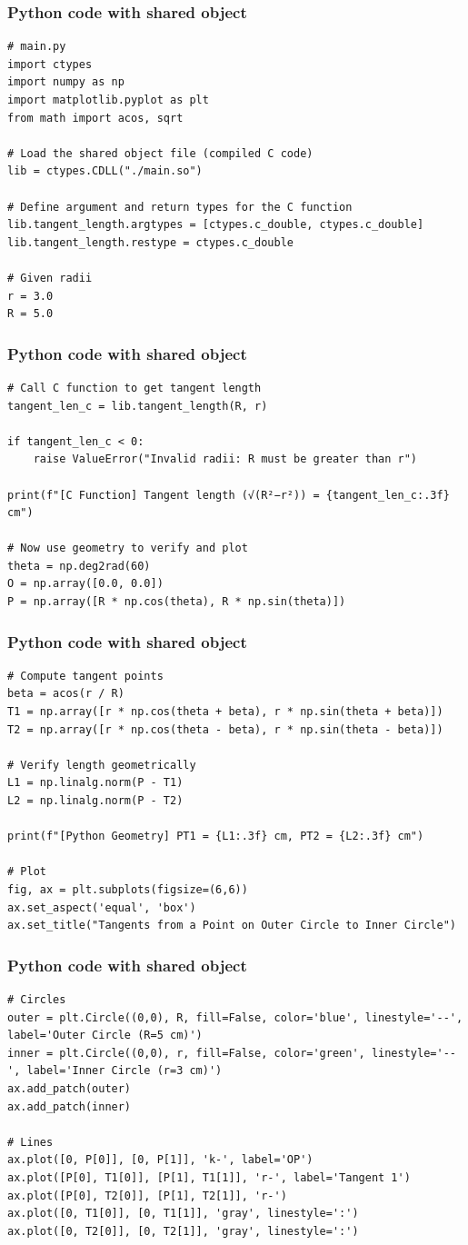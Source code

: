 \documentclass{beamer}
\begin{document}
\begin{frame}[fragile]
\frametitle{Python code with shared object}
\begin{lstlisting}
# main.py
import ctypes
import numpy as np
import matplotlib.pyplot as plt
from math import acos, sqrt

# Load the shared object file (compiled C code)
lib = ctypes.CDLL("./main.so")

# Define argument and return types for the C function
lib.tangent_length.argtypes = [ctypes.c_double, ctypes.c_double]
lib.tangent_length.restype = ctypes.c_double

# Given radii
r = 3.0
R = 5.0
\end{lstlisting}
\end{frame}
\begin{frame}[fragile]
\frametitle{Python code with shared object}
\begin{lstlisting}
# Call C function to get tangent length
tangent_len_c = lib.tangent_length(R, r)

if tangent_len_c < 0:
    raise ValueError("Invalid radii: R must be greater than r")

print(f"[C Function] Tangent length (√(R²−r²)) = {tangent_len_c:.3f} cm")

# Now use geometry to verify and plot
theta = np.deg2rad(60)
O = np.array([0.0, 0.0])
P = np.array([R * np.cos(theta), R * np.sin(theta)])
\end{lstlisting}
\end{frame}
\begin{frame}[fragile]
\frametitle{Python code with shared object}
\begin{lstlisting}
# Compute tangent points
beta = acos(r / R)
T1 = np.array([r * np.cos(theta + beta), r * np.sin(theta + beta)])
T2 = np.array([r * np.cos(theta - beta), r * np.sin(theta - beta)])

# Verify length geometrically
L1 = np.linalg.norm(P - T1)
L2 = np.linalg.norm(P - T2)

print(f"[Python Geometry] PT1 = {L1:.3f} cm, PT2 = {L2:.3f} cm")

# Plot
fig, ax = plt.subplots(figsize=(6,6))
ax.set_aspect('equal', 'box')
ax.set_title("Tangents from a Point on Outer Circle to Inner Circle")
\end{lstlisting}
\end{frame}
\begin{frame}[fragile]
\frametitle{Python code with shared object}
\begin{lstlisting}
# Circles
outer = plt.Circle((0,0), R, fill=False, color='blue', linestyle='--', label='Outer Circle (R=5 cm)')
inner = plt.Circle((0,0), r, fill=False, color='green', linestyle='--', label='Inner Circle (r=3 cm)')
ax.add_patch(outer)
ax.add_patch(inner)

# Lines
ax.plot([0, P[0]], [0, P[1]], 'k-', label='OP')
ax.plot([P[0], T1[0]], [P[1], T1[1]], 'r-', label='Tangent 1')
ax.plot([P[0], T2[0]], [P[1], T2[1]], 'r-')
ax.plot([0, T1[0]], [0, T1[1]], 'gray', linestyle=':')
ax.plot([0, T2[0]], [0, T2[1]], 'gray', linestyle=':')
\end{lstlisting}
\end{frame}
\end{document}
